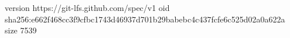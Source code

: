 version https://git-lfs.github.com/spec/v1
oid sha256:e662f468cc3f9cfbc1743d46937d701b29babebc4c437fcfe6c525d02a0a622a
size 7539
